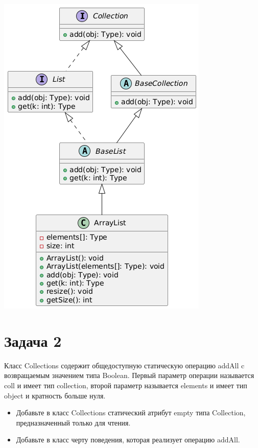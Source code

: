 \documentclass{article}
\begin{document}
\includegraphics[width=\textwidth]{1.png}
\section{Задача 2}
Класс Collections содержит общедоступную статическую операцию addAll c возвращаемым значением типа Boolean. Первый параметр операции называется coll и имеет тип collection, второй параметр называется elements и имеет тип object и кратность больше нуля.

\begin{itemize}
    \item Добавьте в класс Collections статический атрибут empty типа Collection, предназначенный только для чтения.
    \item Добавьте в класс черту поведения, которая реализует операцию addAll.
\end{itemize}
\end{document}
